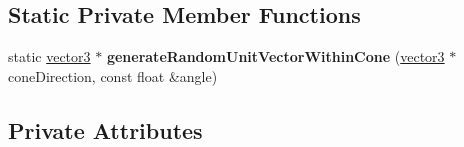 \subsection*{Static Private Member Functions}
\begin{DoxyCompactItemize}
\item 
\mbox{\label{classflounder_1_1particlesystem_a69c88011e198f72c46452caf46077174}} 
static \hyperlink{classflounder_1_1vector3}{vector3} $\ast$ {\bfseries generate\+Random\+Unit\+Vector\+Within\+Cone} (\hyperlink{classflounder_1_1vector3}{vector3} $\ast$cone\+Direction, const float \&angle)
\end{DoxyCompactItemize}
\subsection*{Private Attributes}
